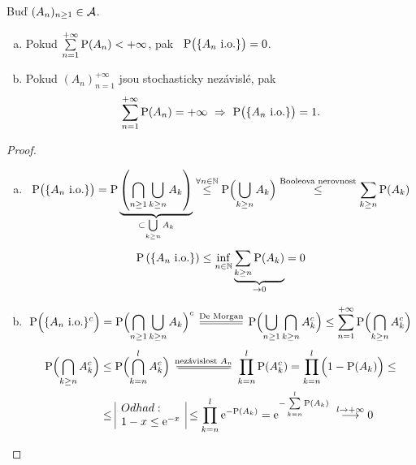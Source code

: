 \begin{theorem}
	Buď $(A_n)_{n \geq 1} \in \mathcal{A} $.
	\begin{enumerate}[a)]
		\item Pokud $\sum\limits_{n=1}^{+\infty} \mathrm{P}(A_n)<+\infty$, pak ~$ \mathrm{P}\bigl(\{A_n\text{ i.o.}\}\bigr)=0$.
		\item Pokud $(A_n)_{n=1}^{+\infty}$ jsou stochasticky nezávislé, pak $$\sum\limits_{n=1}^{+\infty} \mathrm{P}(A_n)=+\infty ~\Rightarrow~ \mathrm{P}\bigl(\{A_n\text{ i.o.}\}\bigr)=1.$$
	\end{enumerate}
\begin{proof}
	\begin{enumerate}[a)]
		\item $$\mathrm{P}\bigl(\{A_n\text{ i.o.}\}\bigr)=\mathrm{P}\underbrace{\left( \bigcap\limits_{n \geq 1} \bigcup\limits_{k \geq n} A_k\right)}_{\subset \bigcup\limits_{k \geq n} A_k} \stackrel{\forall n\in\mathbb{N}}{\leq} \mathrm{P}\Bigl( \bigcup\limits_{k \geq n} A_k\Bigr) \stackrel{\text{Booleova nerovnost}}{\leq}\sum\limits_{k \geq n}\mathrm{P}(A_k)$$
		$$ \mathrm{P}\left(\{A_n\text{ i.o.}\}\right) \leq \inf\limits_{n \in \mathbb{N}} \underbrace{\sum\limits_{k \geq n}\mathrm{P}(A_k)}_{\to 0  }=0$$
		
		\item 
		$$ \PP\Bigl(\{A_n\text{ i.o.}\}^c\Bigr) = \PP\Bigl( \bigcap\limits_{n \geq 1} \bigcup\limits_{k \geq n} A_k\Bigr)^c \equal{\text{De~Morgan}} \PP\Bigl( \bigcup\limits_{n \geq 1} \bigcap\limits_{k \geq n} A_k^c\Bigr) \leq \sum\limits_{n=1}^{+\infty} \PP\Bigl(  \bigcap\limits_{k \geq n} A_k^c\Bigr)$$ 
		\[
		\begin{split}\PP\Bigl(  \bigcap\limits_{k \geq n} A_k^c\Bigr)&\leq \PP\Bigl(  \bigcap\limits_{k = n}^{l} A_k^c\Bigr)\equal{\text{nezávislost~}  A_n}\prod\limits_{k=n}^l \PP(A_k^c)=\prod\limits_{k=n}^l\Bigl(1-\PP(A_k)\Bigr)\leq \\ &\leq 
		\begin{array}{|l|}Odhad: \\
		1-x\leq \me^{-x}
		\end{array} 
		 \leq \prod\limits_{k=n}^l \me^{-\PP(A_k)}=\me^{-\sum\limits_{k=n}^l\PP(A_k)} ~\stackrel{l \to +\infty}{\longrightarrow} 0 
		\end{split}
		\]
	\end{enumerate}
\end{proof}
\end{theorem}
